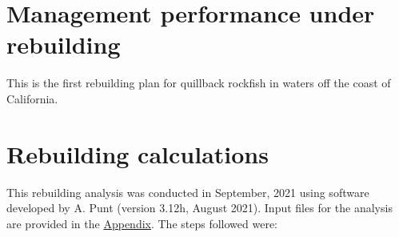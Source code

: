 \documentclass[11pt,
  english,
  a4paper,
]{article}
\begin{document}
\hypertarget{management-performance-under-rebuilding}{%
\section{Management performance under rebuilding}\label{management-performance-under-rebuilding}}

\leavevmode\tagmcend\tagstructend


This is the first rebuilding plan for quillback rockfish in waters off the coast of California.

\leavevmode\tagmcend\tagstructend\par


\hypertarget{rebuilding-calculations}{%
\section{Rebuilding calculations}\label{rebuilding-calculations}}

\leavevmode\tagmcend\tagstructend


This rebuilding analysis was conducted in September, 2021 using software developed by A. Punt (version 3.12h, August 2021). Input files for the analysis are provided in the {\protect\hyperlink{append}{Appendix}\leavevmode\tagmcend\tagstructend}. The steps followed were:

\leavevmode\tagmcend\tagstructend\par
\end{document}
